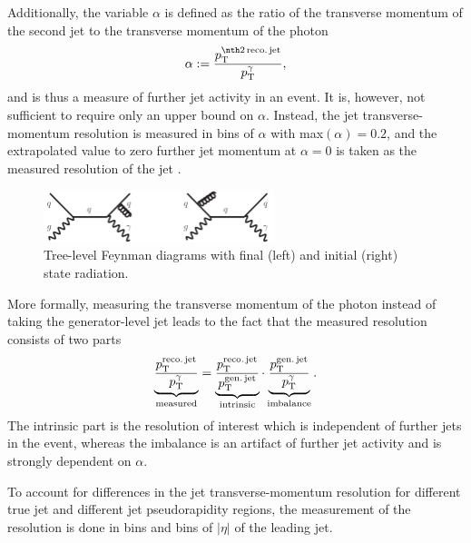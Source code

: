 Additionally, the variable $\alpha$ is defined as the ratio of the transverse momentum of the second jet to the transverse momentum of the photon
\begin{equation}
\label{res:eq:alphaDef}
\alpha := \frac{\ptsecondrecojet}{\ptgamma},
\end{equation} 
and is thus a measure of further jet activity in an event. 
It is, however, not sufficient to require only an upper bound on $\alpha$. 
Instead, the jet transverse-momentum resolution is measured in bins of $\alpha$ with max$\left( \alpha \right) =0.2 $, 
and the extrapolated value to zero further jet momentum at $\alpha=0$ is taken as the measured resolution of the jet \pt. %
\begin{figure}[t]
  \centering
      \includegraphics[width=0.60\textwidth]{figures/resolution/generalApproach/FeynmanDiagramsWithRadiation.pdf}
  \caption{Tree-level Feynman diagrams with final (left) and initial (right) state radiation.}  
  \label{res:fig:FeynmanDiagramsWithRadiation}
\end{figure}

More formally, measuring the transverse momentum of the photon instead of taking the generator-level jet \pt leads to the fact that the measured resolution consists of two parts
\begin{equation}\label{res:eq:splitting}
\underbrace{\frac{{p}_\mathrm{T}^{\text{reco.\,jet}}}{{p}_\mathrm{T}^{\gamma}}}_{\text{measured}} = \underbrace{\frac{{p}_\mathrm{T}^{\text{reco.\,jet}}}{{p}_\mathrm{T}^{\text{gen.\,jet}}}}_{\text{intrinsic}} \cdot \underbrace{\frac{{p}_\mathrm{T}^{\text{gen.\,jet}}}{{p}_\mathrm{T}^{\gamma}}}_{\text{imbalance}}.
\end{equation}
The intrinsic part is the resolution of interest which is independent of further jets in the event, whereas the imbalance is an artifact of further jet activity and is strongly dependent on $\alpha$.


To account for differences in the jet transverse-momentum resolution for different true jet \pt and different jet pseudorapidity regions, the measurement of the resolution is done in \ptgamma bins and bins of $|\eta|$ of the leading jet.


